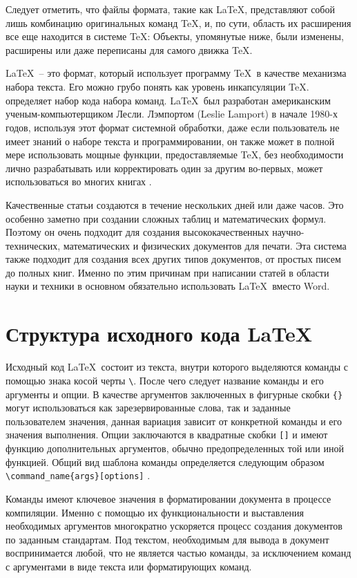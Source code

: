 Следует отметить, что файлы формата, такие как \LaTeX, представляют собой лишь комбинацию оригинальных команд \TeX, и, по сути, область их расширения все еще находится в системе TeX: Объекты, упомянутые ниже, были изменены, расширены или даже переписаны для самого движка TeX.

\LaTeX \verb| |-- это формат, который использует программу \TeX \verb| |в качестве механизма набора текста. Его можно грубо понять как уровень инкапсуляции TeX. \guillemotright \verb| |определяет набор кода набора команд. \LaTeX \verb| |был разработан американским ученым-компьютерщиком Лесли. Лэмпортом (Leslie Lamport) в начале 1980-х годов, используя этот формат системной обработки, даже если пользователь не имеет знаний о наборе текста и программировании, он также может в полной мере использовать мощные функции, предоставляемые TeX, без необходимости лично разрабатывать или корректировать один за другим во-первых, может использоваться во многих книгах \cite{22}.

Качественные статьи создаются в течение нескольких дней или даже часов. Это особенно заметно при создании сложных таблиц и математических формул.  Поэтому он очень подходит для создания высококачественных научно-технических, математических и физических документов для печати. Эта система также подходит для создания всех других типов документов, от простых писем до полных книг. Именно по этим причинам при написании статей в области науки и техники в основном обязательно использовать \LaTeX \verb| |вместо Word.

\section{Структура исходного кода LaTeX}

Исходный код \LaTeX\verb| |состоит из текста, внутри которого выделяются команды с помощью знака косой черты \verb|\|. После чего следует название команды и его аргументы и опции. В качестве аргументов заключенных в фигурные скобки \verb|{}| могут использоваться как зарезервированные слова, так и заданные пользователем значения, данная вариация зависит от конкретной команды и его значения выполнения. Опции заключаются в квадратные скобки \verb|[]| и имеют функцию дополнительных аргументов, обычно предопределенных той или иной функцией. Общий вид шаблона команды определяется следующим образом \verb|\command_name{args}[options]| \cite{24}. 

Команды имеют ключевое значения в форматировании документа в процессе компиляции. Именно с помощью их функциональности и выставления необходимых аргументов многократно ускоряется процесс создания документов по заданным стандартам. Под текстом, необходимым для вывода в документ воспринимается любой, что не является частью команды, за исключением команд с аргументами в виде текста или форматирующих команд. 

